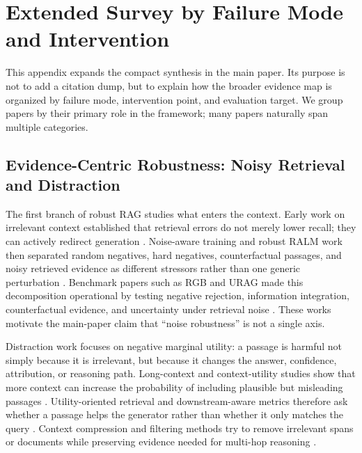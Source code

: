 \documentclass[11pt]{article}
\begin{document}


\section{Extended Survey by Failure Mode and Intervention}
\label{sec:extended-survey}

This appendix expands the compact synthesis in the main paper. Its purpose is not to add a citation dump, but to explain how the broader evidence map is organized by failure mode, intervention point, and evaluation target. We group papers by their primary role in the framework; many papers naturally span multiple categories.

\subsection{Evidence-Centric Robustness: Noisy Retrieval and Distraction}

The first branch of robust RAG studies what enters the context. Early work on irrelevant context established that retrieval errors do not merely lower recall; they can actively redirect generation \citep{irrelevantContext2023}. Noise-aware training and robust RALM work then separated random negatives, hard negatives, counterfactual passages, and noisy retrieved evidence as different stressors rather than one generic perturbation \citep{raat2024,rrag037,rrag091}. Benchmark papers such as RGB and URAG made this decomposition operational by testing negative rejection, information integration, counterfactual evidence, and uncertainty under retrieval noise \citep{rgb2023,rrag001}. These works motivate the main-paper claim that ``noise robustness'' is not a single axis.

Distraction work focuses on negative marginal utility: a passage is harmful not simply because it is irrelevant, but because it changes the answer, confidence, attribution, or reasoning path. Long-context and context-utility studies show that more context can increase the probability of including plausible but misleading passages \citep{rrag003,rrag039,rrag032}. Utility-oriented retrieval and downstream-aware metrics therefore ask whether a passage helps the generator rather than whether it only matches the query \citep{rrag058,rrag067,rrag073,rrag081,rrag088}. Context compression and filtering methods try to remove irrelevant spans or documents while preserving evidence needed for multi-hop reasoning \citep{rrag044,chainOfNote2023,sufficientContext2024,rrag043,rrag048,rrag055}.
\end{document}

